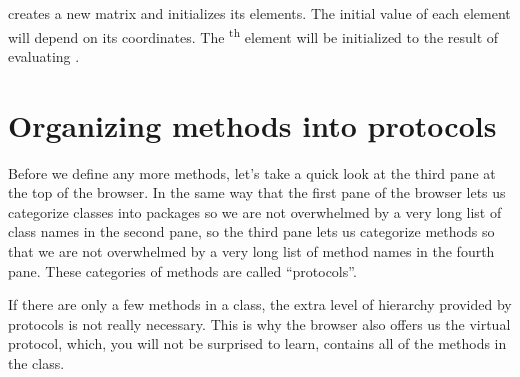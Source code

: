 \documentclass[a4paper,10pt,twoside]{book}
\begin{document}
 creates a new  matrix and initializes its elements.  The initial value of each element will depend on its coordinates.  The \textsuperscript{th} element will be initialized to the result of evaluating .  





\section{Organizing methods into protocols}

Before we define any more methods, let's take a quick look at the third pane at the top of the browser.
In the same way that the first pane of the browser lets us categorize classes into packages so we are not overwhelmed by a very long list of class names in the second pane, so the third pane lets us categorize methods so that we are not overwhelmed by a very long list of method names in the fourth pane.   
These categories of methods are called ``protocols''.

If there are only a few methods in a class, the extra level of hierarchy provided by protocols is not really necessary.
This is why the browser also offers us the  virtual protocol, which, you will not be surprised to learn, contains all of the methods in the class.
\end{document}
